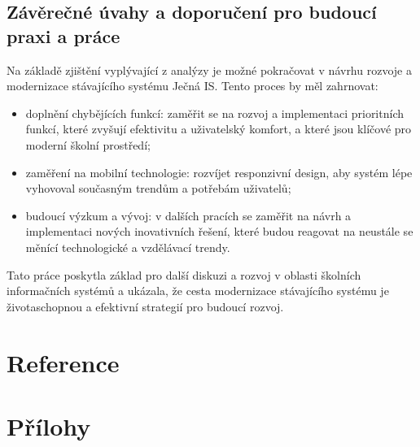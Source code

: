\documentclass[FM,Proj]{tulthesis}
\begin{document}
\section{Závěrečné úvahy a doporučení pro budoucí praxi a práce}
Na základě zjištění vyplývající z analýzy je možné pokračovat v návrhu rozvoje a 
modernizace stávajícího systému Ječná IS. Tento proces by měl zahrnovat:

\begin{itemize}
    \item doplnění chybějících funkcí: zaměřit se na rozvoj a implementaci prioritních funkcí,
    které zvyšují efektivitu a uživatelský komfort, a které jsou klíčové pro moderní 
    školní prostředí;
    \item zaměření na mobilní technologie: rozvíjet responzivní design, aby systém lépe 
    vyhovoval současným trendům a potřebám uživatelů;
    \item budoucí výzkum a vývoj: v dalších pracích se zaměřit na návrh a implementaci 
    nových inovativních řešení, které budou reagovat na neustále se měnící technologické 
    a vzdělávací trendy.
\end{itemize}

Tato práce poskytla základ pro další diskuzi a rozvoj v oblasti školních informačních systémů 
a ukázala, že cesta modernizace stávajícího systému je životaschopnou a efektivní strategií 
pro budoucí rozvoj.

\chapter{Reference}
\printbibliography[heading=none]

\chapter{Přílohy}
\end{document}
